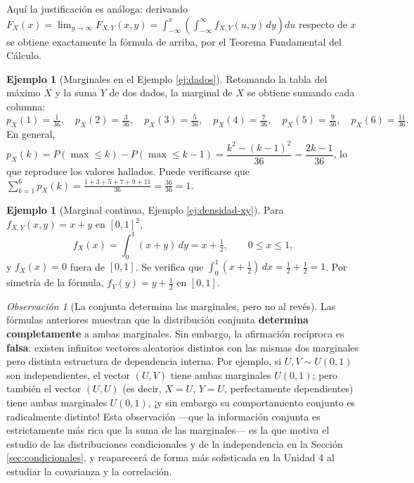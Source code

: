 \documentclass[11pt,a4paper]{article}
\theoremstyle{plain}
\theoremstyle{definition}
\newtheorem{ejemplo}[teorema]{Ejemplo}
\theoremstyle{remark}
\newtheorem{observacion}[teorema]{Observación}
\begin{document}
Aquí la justificación es análoga: derivando $F_X(x) = \lim_{y\to\infty}F_{X,Y}(x,y) = \int_{-\infty}^x\left(\int_{-\infty}^\infty f_{X,Y}(u,y)\,dy\right)du$ respecto de $x$ se obtiene exactamente la fórmula de arriba, por el Teorema Fundamental del Cálculo.

\begin{ejemplo}[Marginales en el Ejemplo \ref{ej:dados}]
Retomando la tabla del máximo $X$ y la suma $Y$ de dos dados, la marginal de $X$ se obtiene sumando cada columna:
\[
p_X(1)=\tfrac{1}{36}, \quad p_X(2)=\tfrac{3}{36}, \quad p_X(3)=\tfrac{5}{36}, \quad p_X(4)=\tfrac{7}{36}, \quad p_X(5)=\tfrac{9}{36}, \quad p_X(6)=\tfrac{11}{36}.
\]
En general, $p_X(k) = P(\max\le k) - P(\max\le k-1) = \dfrac{k^2-(k-1)^2}{36}=\dfrac{2k-1}{36}$, lo que reproduce los valores hallados. Puede verificarse que $\sum_{k=1}^6 p_X(k) = \frac{1+3+5+7+9+11}{36}=\frac{36}{36}=1$.
\end{ejemplo}

\begin{ejemplo}[Marginal continua, Ejemplo \ref{ej:densidad-xy}]
Para $f_{X,Y}(x,y)=x+y$ en $[0,1]^2$,
\[
f_X(x) = \int_0^1 (x+y)\,dy = x+\tfrac12, \qquad 0\le x\le1,
\]
y $f_X(x)=0$ fuera de $[0,1]$. Se verifica que $\int_0^1(x+\tfrac12)\,dx=\tfrac12+\tfrac12=1$. Por simetría de la fórmula, $f_Y(y)=y+\tfrac12$ en $[0,1]$.
\end{ejemplo}

\begin{observacion}[La conjunta determina las marginales, pero no al revés]\label{obs:noalreves}
Las fórmulas anteriores muestran que la distribución conjunta \textbf{determina completamente} a ambas marginales. Sin embargo, la afirmación recíproca es \textbf{falsa}: existen infinitos vectores aleatorios distintos con las mismas dos marginales pero distinta estructura de dependencia interna. Por ejemplo, si $U,V\sim U(0,1)$ son independientes, el vector $(U,V)$ tiene ambas marginales $U(0,1)$; pero también el vector $(U,U)$ (es decir, $X=U$, $Y=U$, perfectamente dependientes) tiene ambas marginales $U(0,1)$, ¡y sin embargo su comportamiento conjunto es radicalmente distinto! Esta observación —que la información conjunta es estrictamente más rica que la suma de las marginales— es la que motiva el estudio de las distribuciones condicionales y de la independencia en la Sección \ref{sec:condicionales}, y reaparecerá de forma más sofisticada en la Unidad 4 al estudiar la covarianza y la correlación.
\end{observacion}
\end{document}
